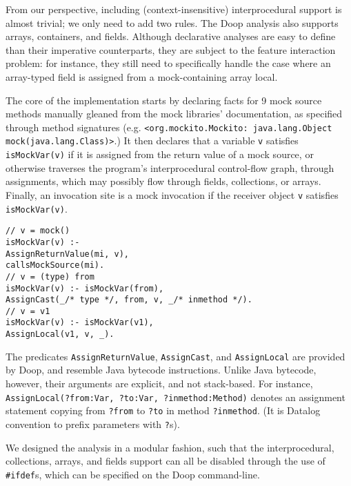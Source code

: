 From our perspective, including (context-insensitive) interprocedural support is almost trivial; we only need to add two rules. The Doop analysis also supports arrays, containers, and fields. Although declarative analyses are easy to define than their imperative counterparts, they are subject to the feature interaction problem: for instance, they still need to specifically handle the case where an array-typed field is assigned from a mock-containing array local.

The core of the implementation starts by declaring facts for 9 mock source methods manually gleaned from the mock libraries' documentation, as specified through method signatures (e.g. 
\texttt{<org.mockito.Mockito: java.lang.Object mock(java.lang.Class)>}.)
It then declares that a variable {\tt v} satisfies \verb+isMockVar(v)+ if it is assigned from the return value of a mock source, or otherwise traverses the program's interprocedural control-flow graph, through assignments, which may possibly flow through fields, collections, or arrays. Finally, an invocation site is a mock invocation if the receiver object {\tt v} satisfies \verb+isMockVar(v)+.

\begin{lstlisting}[basicstyle=\ttfamily\small,numbers=none,label={lst:core}]
// v = mock()
isMockVar(v) :-
AssignReturnValue(mi, v),
callsMockSource(mi).
// v = (type) from
isMockVar(v) :- isMockVar(from),
AssignCast(_/* type */, from, v, _/* inmethod */).
// v = v1
isMockVar(v) :- isMockVar(v1),
AssignLocal(v1, v, _).
\end{lstlisting}

The predicates \texttt{AssignReturnValue}, \texttt{AssignCast}, and \texttt{AssignLocal} are provided by Doop, and resemble Java bytecode instructions. Unlike Java bytecode, however, their arguments are explicit, and not stack-based. For instance, \texttt{AssignLocal(?from:Var, ?to:Var, ?inmethod:Method)} denotes an assignment statement copying from \texttt{?from} to \texttt{?to} in method \texttt{?inmethod}. (It is Datalog convention to prefix parameters with \texttt{?}s).

We designed the analysis in a modular fashion, such that the interprocedural, collections, arrays, and fields support can all be disabled through the use of \verb+#ifdef+s, which can be specified on the Doop command-line.


